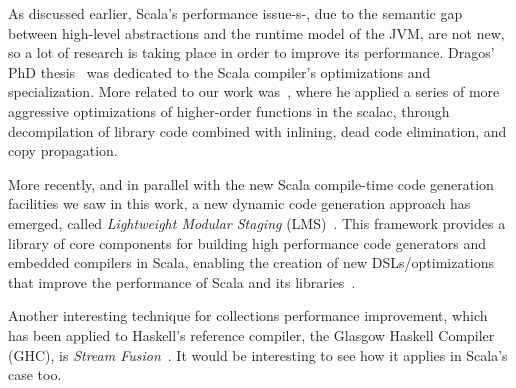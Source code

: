 \label{related}
As discussed earlier, Scala's performance issue-s-, due to the semantic gap between high-level abstractions and the runtime model of the JVM, are not new, so a lot of research is taking place in order to improve its performance. Dragos' PhD thesis~\cite{dragos2010compiling} was dedicated to the Scala compiler's optimizations and specialization. More related to our work was~\cite{dragos2008optimizing}, where he applied a series of more aggressive optimizations of higher-order functions in the scalac, through decompilation of library code combined with inlining, dead code elimination, and copy propagation.

More recently, and in parallel with the new Scala compile-time code generation facilities we saw in this work, a new dynamic code generation approach has emerged, called \emph{Lightweight Modular Staging} (LMS)~\cite{rompf2010lightweight,rompf2011building}. This framework provides a library of core components for building high performance code generators and embedded compilers in Scala, enabling the creation of new DSLs/optimizations that improve the performance of Scala and its libraries~\cite{moors2012scala,brown2011heterogeneous,ureche2012stagedsac,rompf2013optimizing}.

Another interesting technique for collections performance improvement, which has been applied to Haskell's reference compiler, the Glasgow Haskell Compiler (GHC), is \emph{Stream Fusion}~\cite{coutts2007stream,mainlandhaskell}. It would be interesting to see how it applies in Scala's case too.
